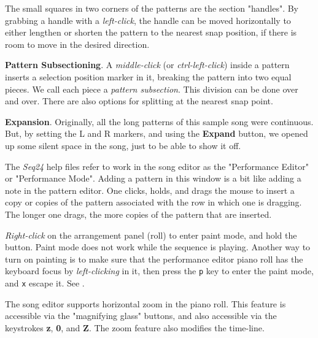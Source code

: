 \begin{enumber}
         The small squares in two corners of the patterns are the section
         "handles".
         By grabbing a handle with a \textsl{left-click},
         the handle can be moved
         horizontally to either lengthen or shorten the pattern to the nearest
         snap position, if there is room to move in the desired direction.
      \item \textbf{Pattern Subsectioning}.
         A \textsl{middle-click} (or \textsl{ctrl-left-click})
         inside a pattern inserts a selection position
         marker in it, breaking the pattern into two equal pieces.
         We call each piece a \textsl{pattern subsection}.
         This division can be done over and over.
         There are also options for splitting at the nearest snap point.
      \item \textbf{Expansion}.
         Originally, all the long patterns of this sample song were continuous.
         But, by setting the L and R markers, and using the \textbf{Expand}
         button, we opened up some silent space in the song, just to be able
         to show it off.
   \end{enumber}

   The \textsl{Seq24} help files refer to work in the song editor as the
   "Performance Editor" or "Performance Mode".  Adding a pattern in this
   window is a bit like adding a note in the pattern editor.
   One clicks, holds, and drags the mouse to insert a copy or copies of the
   pattern associated with the row in which one is dragging.
   The longer one drags, the more copies of the pattern that are inserted.

	\textsl{Right-click} on the arrangement panel (roll) to enter
   paint mode, and hold the button.
   Paint mode does not work while the sequence is playing.
   Another way to turn on painting is to
   make sure that the performance editor piano roll has the
   keyboard focus by \textsl{left-clicking} in it, then press the
   \texttt{p} key to enter the paint mode, and
   \texttt{x} escape it.
   See .

   The song editor supports horizontal zoom in the piano roll.
   This feature is accessible via the "magnifying glass" buttons, and also
   accessible via the keystrokes \textbf{z}, \textbf{0}, and \textbf{Z}.
   The zoom feature also modifies the time-line.

